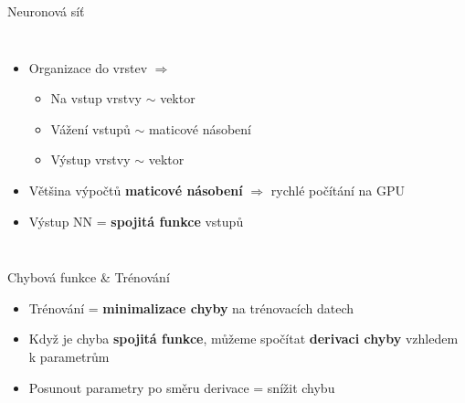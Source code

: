 \documentclass[aspectratio=169,dvipsnames]{beamer}
\begin{document}
\begin{frame}{Neuronová síť}

    \begin{columns}

        \scalebox{.75}{}

        \begin{itemize}[<+->]

            \item Organizace do vrstev $\Rightarrow$

            \begin{itemize}[<+->]

                \item Na vstup vrstvy $\sim$ vektor

                \item Vážení vstupů $\sim$ maticové násobení

                \item Výstup vrstvy $\sim$ vektor

            \end{itemize}

        \item Většina výpočtů \textbf{maticové násobení} $\Rightarrow$ rychlé počítání
            na GPU

        \item Výstup NN = \textbf{spojitá funkce} vstupů

        \end{itemize}
    \end{columns}

\end{frame}


\begin{frame}{Chybová funkce \& Trénování}

    \begin{itemize}[<+->]

        \item Trénování = \textbf{minimalizace chyby} na trénovacích datech

        \item Když je chyba \textbf{spojitá funkce}, můžeme spočítat
            \textbf{derivaci chyby} vzhledem k parametrům

        \item Posunout parametry po směru derivace = snížit chybu

    \end{itemize}

\end{frame}
\end{document}
